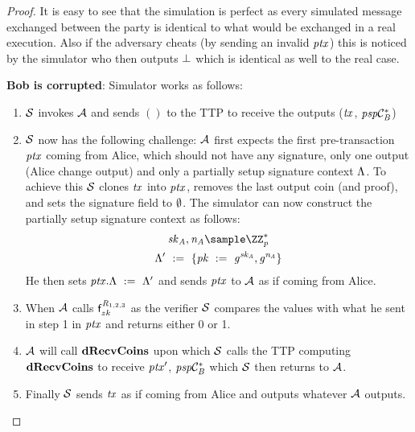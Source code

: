 \begin{proof}
    It is easy to see that the simulation is perfect as every simulated message exchanged between the party is identical to what would be exchanged in a real execution.
    Also if the adversary cheats (by sending an invalid $\mathit{ptx}$) this is noticed by the simulator who then outputs $\bot$ which is identical as well to the real case.

    \textbf{Bob is corrupted}: Simulator works as follows:
    \begin{enumerate}
        \item $\mathcal{S}$ invokes $\mathcal{A}$ and sends $()$ to the TTP to receive the outputs ($\mathit{tx}$, $\mathit{psp}\mathcal{C}_{\mathit{B}}^*$)
        \item $\mathcal{S}$ now has the following challenge: $\mathcal{A}$ first expects the first pre-transaction $\mathit{ptx}$ coming from Alice, which should not have any signature, only one output (Alice change output) and only a partially setup signature context $\Lambda$.
        To achieve this $\mathcal{S}$ clones $\mathit{tx}$ into $\mathit{ptx}$, removes the last output coin (and proof), and sets the signature field to $\emptyset$.
        The simulator can now construct the partially setup signature context as follows:
        \begin{gather*}
            \varSecKeyAlice, \varNonceAlice \sample \cnstIntegersPrimeWithoutZero{\varPrime} \\
            \funStarAlt{\varSigContext} \opAssign \{ \varPubKey \opAssign \funGen{\varSecKeyAlice}, \funGen{\varNonceAlice} \}
        \end{gather*}
        He then sets $\mathit{ptx}.\Lambda ~:=~ {\Lambda}'$ and sends $\mathit{ptx}$ to $\mathcal{A}$ as if coming from Alice.
        \item When $\mathcal{A}$ calls $\mathsf{f}^{\mathit{R}_{1,2,3}}_{zk}$ as the verifier $\mathcal{S}$ compares the values with what he sent in step 1 in $\mathit{ptx}$ and returns either 0 or 1.
        \item $\mathcal{A}$ will call $\mathbf{dRecvCoins}$ upon which $\mathcal{S}$ calls the TTP computing $\mathbf{dRecvCoins}$ to receive ${\mathit{ptx}}'$, $\mathit{psp}\mathcal{C}_{\mathit{B}}^*$ which $\mathcal{S}$ then returns to $\mathcal{A}$.
        \item Finally $\mathcal{S}$ sends $\mathit{tx}$ as if coming from Alice and outputs whatever $\mathcal{A}$ outputs.
    \end{enumerate}


\end{proof}

